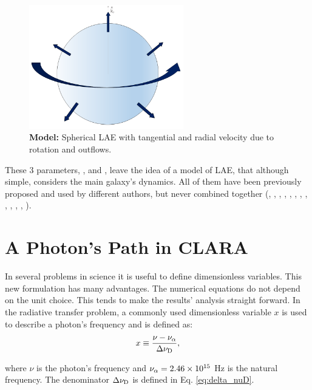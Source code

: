 \begin{figure}[h!]
	\begin{center}
		\includegraphics[width=0.6\textwidth]{./figures/chapter2/model}
	\end{center}
	\caption{\textbf{Model:} Spherical LAE with tangential and radial velocity due to rotation and outflows.
		\label{fig:model}}
\end{figure}


These 3 parameters, \vrot, \vout and \tauh, leave the idea of a model of LAE, that although simple, considers the main galaxy's dynamics. All of them have been previously proposed and used by different authors, but never combined together (\cite{Adams72}, \cite{Harrington73}, \cite{Neufeld90}, \cite{Dijkstra06}, \cite{Verhamme06}, \cite{Forero12}, \cite{Martin2015}, \cite{Garavito14}, \cite{Neufeld91}, \cite{Laursen09}, \cite{Barnes11}, \cite{Verhamme12}, \cite{Yajima12}).\\

\section{A \lya Photon's Path in CLARA}
In several problems in science it is useful to define dimensionless variables. This new formulation has many advantages. The numerical equations do not depend on the unit choice. This tends to make the results' analysis straight forward. In the \lya radiative transfer problem, a commonly used dimensionless variable $x$ is used to describe a photon's frequency and is defined as:\\

\begin{equation}
\label{eq:x_freq}
x \equiv \frac{\nu -\nu_{\rm \alpha}}{\Delta\nu_{\rm D}},
\end{equation} 

where $\nu$ is the photon's frequency and $\nu_{\rm \alpha} = 2.46\times 10^{15}$ Hz is the \lya natural frequency. The denominator $\Delta\nu_{\rm D}$ is defined in Eq. \ref{eq:delta_nuD}.

